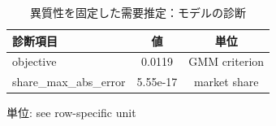 \begingroup
\begin{table}[htbp]
\centering
\caption{異質性を固定した需要推定：モデルの診断}
\label{tab:specialist-blp-fixed-r01-displays-model_fit}
\begin{tabular}{lcc}
\toprule
診断項目 & 値 & 単位 \\
\midrule
objective & 0.0119 & GMM criterion \\
share\_max\_abs\_error & 5.55e-17 & market share \\
\bottomrule
\end{tabular}
\par\medskip\begin{minipage}{\linewidth}\footnotesize
単位: see row-specific unit
\end{minipage}
\end{table}
\endgroup
